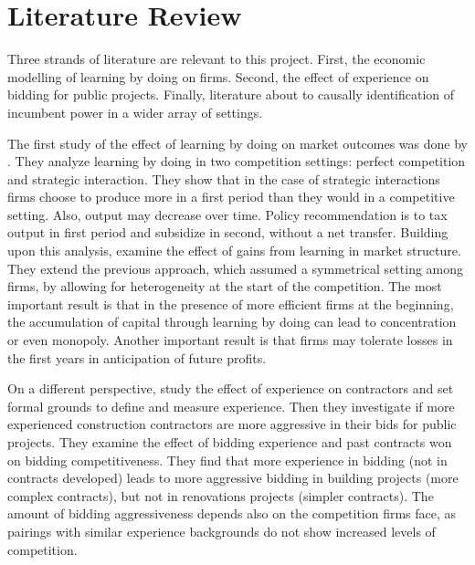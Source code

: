 \chapter{Literature Review}

Three strands of literature are relevant to this project. First, the economic modelling of learning by doing on firms. Second, the effect of experience on bidding for public projects. Finally, literature about to causally identification of incumbent power in a wider array of settings.

The first study of the effect of learning by doing on market outcomes was done by \citep{fudenberg1983learning} . They analyze learning by doing in two competition settings: perfect competition and strategic interaction. They show that in the case of strategic interactions firms choose to produce more in a first period than they would in a competitive setting. Also, output may decrease over time. Policy recommendation is to tax output in first period and subsidize in second, without a net transfer. Building upon this analysis, \citep{dasgupta1988learning} examine the effect of gains from learning in market structure. They extend the previous approach, which assumed a symmetrical setting among firms, by allowing for heterogeneity at the start of the competition. The most important result is that in the presence of more efficient firms at the beginning, the accumulation of capital through learning by doing can lead to concentration or even monopoly. Another important result is that firms may tolerate losses in the first years in anticipation of future profits.

On a different perspective, \citep{fu2002effect} study the effect of experience on contractors and set formal grounds to define and measure experience. Then they investigate if more experienced construction contractors are more aggressive in their bids for public projects. They examine the effect of bidding experience and past contracts won on bidding competitiveness. They find that more experience in bidding (not in contracts developed) leads to more aggressive bidding in building projects (more complex contracts), but not in renovations projects (simpler contracts). The amount of bidding aggressiveness depends also on the competition firms face, as pairings with similar experience backgrounds do not show increased levels of competition.

